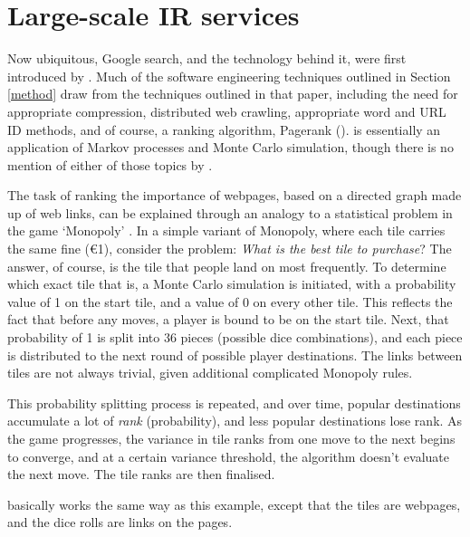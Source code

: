 \section{Large-scale IR services\label{ir}}
Now ubiquitous, Google search, and the technology behind it, were first introduced by .  Much of the software
engineering techniques outlined in Section \ref{method} draw
from the techniques outlined in that paper, including the need
for appropriate compression, distributed web crawling, appropriate word and
URL ID methods, and of course, a ranking algorithm,
Pagerank (\pr{}).  \pr{}
is essentially an application of Markov processes and Monte
Carlo simulation, though there is no mention of
either of those topics by .

The task of ranking the importance of webpages, based on a directed graph
made
up of web links, can be explained through an analogy to a statistical
problem in the
game `Monopoly' \cite{euler84}.  In a simple variant of Monopoly, where each tile carries
the same fine (€1), consider the problem: {\it What is the best tile to
purchase}?  The answer, of course, is the tile that people land on most
frequently. To determine which exact tile that is, a Monte Carlo simulation
is initiated, with a probability value of 1 on the start tile, and a
value of 0 on every other tile.  This reflects the fact that before any
moves, a player is bound to be on the start tile.  Next, that probability of 1 is split into 36 pieces (possible dice combinations), and each piece is distributed to the next round of possible player destinations.
The links between tiles are not always trivial, given additional
complicated Monopoly rules.

This probability splitting process is repeated, and over time,
popular destinations accumulate a lot of {\it rank} (probability),
and less popular destinations lose rank.  As the
game progresses, the variance in tile ranks from one move to the next 
begins to converge, and at a certain variance threshold, the
algorithm doesn't evaluate the next move.  The tile ranks are then
finalised.

\pr{} basically works the same way as this example, except that the
tiles are webpages, and the dice rolls are links on the pages.